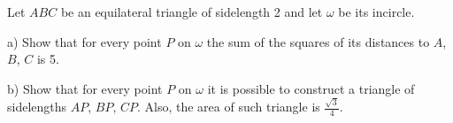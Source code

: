 Let $ABC$ be an equilateral triangle of sidelength 2 and let $\omega$ be its incircle.

a) Show that for every point $P$ on $\omega$ the sum of the squares of its distances to $A$,  $B$,  $C$ is 5.

b) Show that for every point $P$ on $\omega$ it is possible to construct a triangle of sidelengths $AP$,  $BP$,  $CP$. Also, the area of such triangle is $\frac{\sqrt{3}}{4}$.